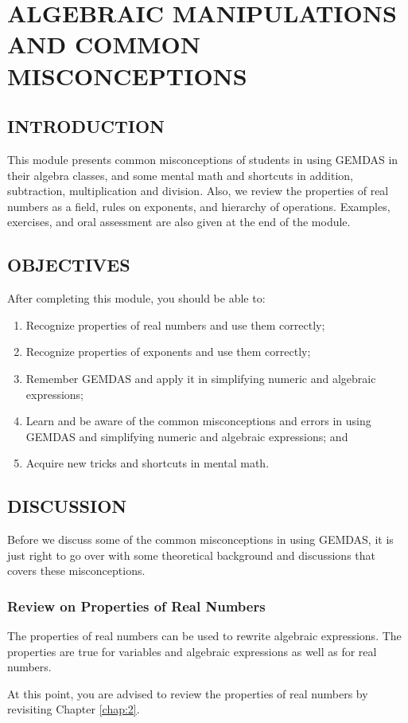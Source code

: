 \chapter{ALGEBRAIC MANIPULATIONS AND COMMON MISCONCEPTIONS}
\section*{INTRODUCTION}
This module presents common misconceptions of students in using GEMDAS in their algebra
classes, and some mental math and shortcuts in addition, subtraction, multiplication and division.
Also, we review the properties of real numbers as a field, rules on exponents, and hierarchy of
operations. Examples, exercises, and oral assessment are also given at the end of the module.
\section*{OBJECTIVES}
After completing this module, you should be able to:
\begin{enumerate}
\item Recognize properties of real numbers and use them correctly;
\item Recognize properties of exponents and use them correctly;
\item Remember GEMDAS and apply it in simplifying numeric and algebraic expressions;
\item Learn and be aware of the common misconceptions and errors in using GEMDAS and
simplifying numeric and algebraic expressions; and
\item Acquire new tricks and shortcuts in mental math.
\end{enumerate}
\section*{DISCUSSION}
Before we discuss some of the common misconceptions in using GEMDAS, it is just right to
go over with some theoretical background and discussions that covers these misconceptions.
\subsection*{Review on Properties of Real Numbers}
The properties of real numbers can be used to rewrite algebraic expressions. The properties
are true for variables and algebraic expressions as well as for real numbers.

At this point, you are advised to review the properties of real numbers by revisiting Chapter \ref{chap:2}.
